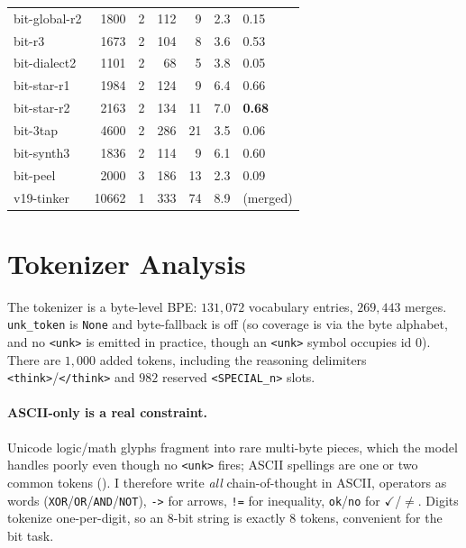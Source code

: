 \documentclass[11pt]{article}
\begin{document}
\begin{longtable}{l r r r r r l}
bit-global-r2   & 1800  & 2 & 112 & 9  & 2.3 & 0.15 \\
bit-r3          & 1673  & 2 & 104 & 8  & 3.6 & 0.53 \\
bit-dialect2    & 1101  & 2 & 68  & 5  & 3.8 & 0.05 \\
bit-star-r1     & 1984  & 2 & 124 & 9  & 6.4 & 0.66 \\
bit-star-r2     & 2163  & 2 & 134 & 11 & 7.0 & \textbf{0.68} \\
bit-3tap        & 4600  & 2 & 286 & 21 & 3.5 & 0.06 \\
bit-synth3      & 1836  & 2 & 114 & 9  & 6.1 & 0.60 \\
bit-peel        & 2000  & 3 & 186 & 13 & 2.3 & 0.09 \\
\addlinespace
v19-tinker      & 10662 & 1 & 333 & 74 & 8.9 & (merged) \\
\end{longtable}

\section{Tokenizer Analysis}
\label{app:tokenizer}

The tokenizer is a byte-level BPE: $131{,}072$ vocabulary entries, $269{,}443$ merges. \texttt{unk\_token} is \texttt{None} and byte-fallback is off (so coverage is via the
byte alphabet, and no \texttt{<unk>} is emitted in practice, though an \texttt{<unk>} symbol
occupies id $0$). There are $1{,}000$ added tokens, including the reasoning delimiters
\verb|<think>|/\verb|</think>| and $982$ reserved \verb|<SPECIAL_n>| slots.

\paragraph{ASCII-only is a real constraint.} Unicode logic/math glyphs fragment into rare
multi-byte pieces, which the model handles poorly even though no \texttt{<unk>} fires; ASCII
spellings are one or two common tokens (). I therefore write \emph{all}
chain-of-thought in ASCII, operators as words (\texttt{XOR}/\texttt{OR}/\texttt{AND}/\texttt{NOT}),
\verb|->| for arrows, \verb|!=| for inequality, \texttt{ok}/\texttt{no} for $\checkmark$/$\neq$.
Digits tokenize one-per-digit, so an 8-bit string is exactly $8$ tokens, convenient for the
bit task.
\end{document}
